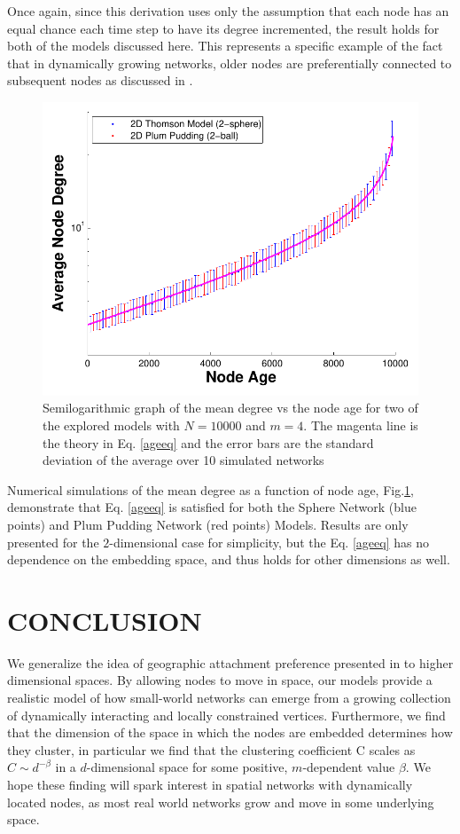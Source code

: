 \documentclass[aps,pre,manuscript,superscriptaddress,amsmath,amssymb,nofootinbib]{revtex4-1}
\begin{document}
Once again, since this derivation uses only the assumption that each node has an equal chance each time step to have its degree incremented, the result holds for both of the models discussed here.
This represents a specific example of the fact that in dynamically growing networks, older nodes are preferentially connected to subsequent nodes as discussed in \cite{reallyrandom}.
\begin{figure}
\includegraphics[width=\linewidth]{figures/figDvsAge.pdf}
\caption{\label{degage}Semilogarithmic graph of the mean degree vs the node age for two of the explored models with $N = 10000$ and $m = 4$. The magenta line is the theory in Eq. \eqref{ageeq} and the error bars are the standard deviation of the average over 10 simulated networks}
\end{figure}
Numerical simulations of the mean degree as a function of node age, Fig.\ref{degage}, demonstrate that Eq. \eqref{ageeq} is satisfied for both the Sphere Network (blue points) and Plum Pudding Network (red points) Models.
Results are only presented for the $2$-dimensional case for simplicity, but the Eq. \eqref{ageeq} has no dependence on the embedding space, and thus holds for other dimensions as well.

\section{CONCLUSION}
We generalize the idea of geographic attachment preference presented in \cite{ozik2004} to higher dimensional spaces.
By allowing nodes to move in space, our models provide a realistic model of how small-world networks can emerge from a growing collection of dynamically interacting and locally constrained vertices.  
Furthermore, we find that the dimension of the space in which the nodes are embedded determines how they cluster, in particular we find that the clustering coefficient C scales as $C \sim d^{-\beta}$ in a $d$-dimensional space for some positive, $m$-dependent value $\beta$.
We hope these finding will spark interest in spatial networks with dynamically located nodes, as most real world networks grow and move in some underlying space.
\end{document}
